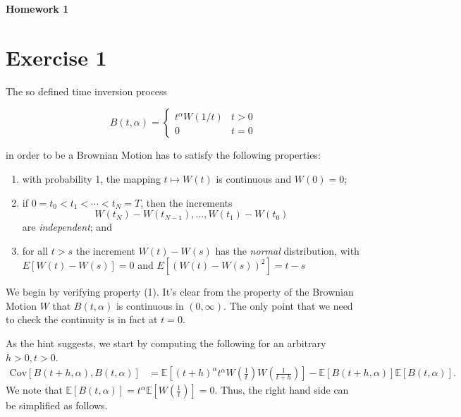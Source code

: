 \documentclass[a4paper,12pt]{article} %
\newcommand{\Cov}{\mathrm{Cov}}
\begin{document}
\begin{center} %
    {\Large \bf Homework 1}
\end{center}

\vspace{0.4cm}


\onehalfspacing
\section{Exercise 1}
The so defined time inversion process

\begin{equation}
    B(t, \alpha) = \begin{cases}
        t^{\alpha} W(1/t) & t > 0 \\
        0                 & t = 0
    \end{cases}
\end{equation}

in order to be a Brownian Motion has to satisfy the following properties:
\begin{enumerate}
    \item with probability 1, the mapping \( t \mapsto W(t) \) is continuous and \( W(0) = 0 \);
    \item if \( 0 = t_0 < t_1 < \cdots < t_N = T \), then the increments
          \[
              W(t_N) - W(t_{N-1}), \dots, W(t_1) - W(t_0)
          \]
          are \textit{independent}; and
    \item for all \( t > s \) the increment \( W(t) - W(s) \) has the \textit{normal} distribution, with \( E[W(t) - W(s)] = 0 \) and \( E[(W(t) - W(s))^2] = t - s \)
\end{enumerate}

We begin by verifying property (1). It's clear from the property of the Brownian Motion \(W\) that \(B(t, \alpha )\) is continuous in \((0, \infty )\). The only point that we need to check the continuity is in fact at \(t=0\).

As the hint suggests, we start by computing the following for an arbitrary \(h>0, t>0\).
\begin{align*}
    \Cov\left[B(t+h, \alpha), B(t, \alpha)\right]
     & = \mathbb{E} \left[ (t+h)^{\alpha} t^{\alpha} W\left( \frac{1}{t} \right) W\left( \frac{1}{t+h} \right) \right] - \mathbb{E} \left[ B(t+h, \alpha) \right] \mathbb{E} \left[ B(t, \alpha) \right].
\end{align*}
We note that \( \mathbb{E} \left[ B(t, \alpha) \right] = t^{\alpha }\mathbb{E} \left[ W\left( \frac{1}{t} \right)  \right]=0 \). Thus, the right hand side can be simplified as follows.
\end{document}
